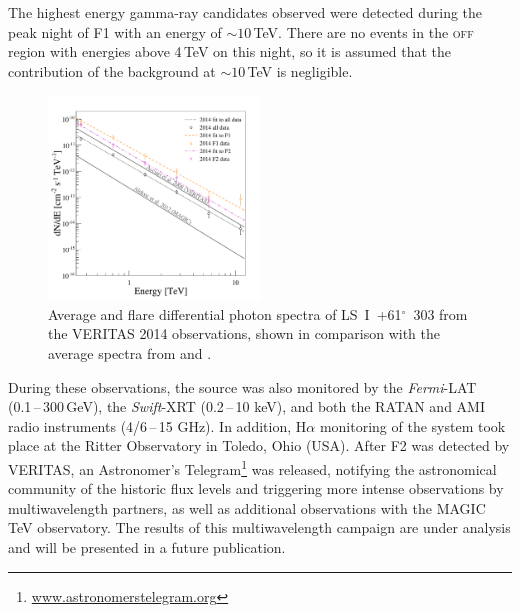\documentclass[preprint2]{aastex}
\newcommand{\lsi}{LS~I~+61$^{\circ}$~303}
\newcommand{\gev}{\,GeV}
\newcommand{\tev}{\,TeV}
\begin{document}
The highest energy gamma-ray candidates observed were detected during the peak night of F1 with an energy of $\sim10$\tev{}. %
There are no events in the \textsc{off} region with energies above 4\tev{} on this night, so it is assumed that the contribution of the background at $\sim10$\tev{} is negligible.

\begin{figure}[ht]
\centering
\includegraphics[width=0.5\textwidth]{figs/all_spectra_coloured.pdf}
\caption{Average and flare differential photon spectra of \lsi{} from the VERITAS 2014 observations, shown in comparison with the average spectra from \citet{VERITASLSIDetection} and \citet{Aleksic}.}
\label{spec}
\end{figure}

During these observations, the source was also monitored by the \emph{Fermi}-LAT (0.1\,--\,300\gev{}), the \emph{Swift}-XRT (0.2\,--\,10 keV), and both the RATAN and AMI radio instruments (4/6\,--\,15 GHz). In addition, H$\alpha$ monitoring of the system took place at the Ritter Observatory in Toledo, Ohio (USA). After F2 was detected by VERITAS, an Astronomer's Telegram\footnote{\url{www.astronomerstelegram.org}} \citep{2015VTSATEL} was released, notifying the astronomical community of the historic flux levels and triggering more intense observations by multiwavelength partners, as well as additional observations with the MAGIC TeV observatory. The results of this multiwavelength campaign are under analysis and will be presented in a future publication. 
\end{document}

